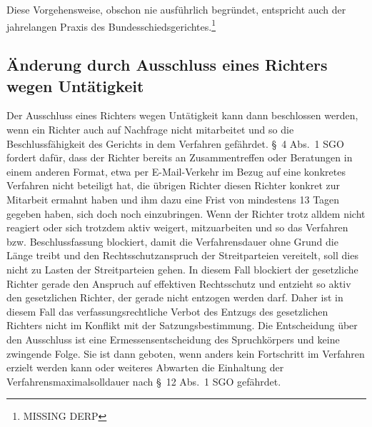 Diese Vorgehensweise, obschon nie ausführlich begründet, entspricht auch der jahrelangen Praxis des Bundesschiedsgerichtes.\footnote{MISSING DERP}

\subsection{Änderung durch Ausschluss eines Richters wegen Untätigkeit}
\label{Zusammensetzung:Spruchkoerper:Untaetigkeit}
Der Ausschluss eines Richters wegen Untätigkeit kann dann beschlossen werden, wenn ein Richter auch auf Nachfrage nicht mitarbeitet und so die Beschlussfähigkeit des Gerichts in dem Verfahren gefährdet.
\S~4 Abs.~1 SGO fordert dafür, dass der Richter bereits an Zusammentreffen oder Beratungen in einem anderen Format, etwa per E-Mail-Verkehr im Bezug auf eine konkretes Verfahren nicht beteiligt hat, die übrigen Richter diesen Richter konkret zur Mitarbeit ermahnt haben und ihm dazu eine Frist von mindestens 13 Tagen gegeben haben, sich doch noch einzubringen.
Wenn der Richter trotz alldem nicht reagiert oder sich trotzdem aktiv weigert, mitzuarbeiten und so das Verfahren bzw. Beschlussfassung blockiert, damit die Verfahrensdauer ohne Grund die Länge treibt und den Rechtsschutzanspruch der Streitparteien vereitelt, soll dies nicht zu Lasten der Streitparteien gehen.
In diesem Fall blockiert der gesetzliche Richter gerade den Anspruch auf effektiven Rechtsschutz und entzieht so aktiv den gesetzlichen Richter, der gerade nicht entzogen werden darf.
Daher ist in diesem Fall das verfassungsrechtliche Verbot des Entzugs des gesetzlichen Richters nicht im Konflikt mit der Satzungsbestimmung.
Die Entscheidung über den Ausschluss ist eine Ermessensentscheidung des Spruchkörpers und keine zwingende Folge.
Sie ist dann geboten, wenn anders kein Fortschritt im Verfahren erzielt werden kann oder weiteres Abwarten die Einhaltung der Verfahrensmaximalsolldauer nach \S~12 Abs.~1 SGO gefährdet.

